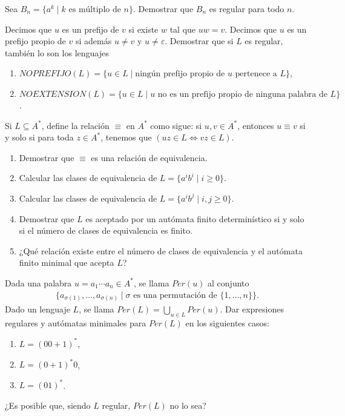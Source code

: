 \begin{ejercicio}
    Sea $B_n = \{a^k \mid k \text{ es múltiplo de } n\}$. Demostrar que $B_n$ es regular para todo $n$.
\end{ejercicio}

\begin{ejercicio}
    Decimos que $u$ es un prefijo de $v$ si existe $w$ tal que $uw = v$. Decimos que $u$ es un prefijo propio de $v$ si además $u \neq v$ y $u \neq \varepsilon$. Demostrar que si $L$ es regular, también lo son los lenguajes
    \begin{enumerate}
        \item $NOPREFIJO(L) = \{u \in L \mid \text{ningún prefijo propio de } u \text{ pertenece a } L\}$,
        \item $NOEXTENSION(L) = \{u \in L \mid u \text{ no es un prefijo propio de ninguna palabra de } L\}$.
    \end{enumerate}
\end{ejercicio}

\begin{ejercicio}
    Si $L \subseteq A^*$, define la relación $\equiv$ en $A^*$ como sigue: si $u, v \in A^*$, entonces $u \equiv v$ si y solo si para toda $z \in A^*$, tenemos que $(uz \in L \Leftrightarrow vz \in L)$.
    \begin{enumerate}
        \item Demostrar que $\equiv$ es una relación de equivalencia.
        \item Calcular las clases de equivalencia de $L = \{a^ib^i \mid i \geq 0\}$.
        \item Calcular las clases de equivalencia de $L = \{a^ib^j \mid i, j \geq 0\}$.
        \item Demostrar que $L$ es aceptado por un autómata finito determinístico si y solo si el número de clases de equivalencia es finito.
        \item ¿Qué relación existe entre el número de clases de equivalencia y el autómata finito minimal que acepta $L$?
    \end{enumerate}
\end{ejercicio}

\begin{ejercicio}
    Dada una palabra $u = a_1 \cdots a_n \in A^*$, se llama $Per(u)$ al conjunto
    \begin{align*}
        \{a_{\sigma(1)}, \ldots, a_{\sigma(n)} \mid \sigma \text{ es una permutación de } \{1, \ldots, n\}\}.
    \end{align*}
    Dado un lenguaje $L$, se llama $Per(L) = \bigcup_{u \in L} Per(u)$.
    Dar expresiones regulares y autómatas minimales para $Per(L)$ en los siguientes casos:
    \begin{enumerate}
        \item $L = (00 + 1)^*$,
        \item $L = (0 + 1)^*0$,
        \item $L = (01)^*$.
    \end{enumerate}
    ¿Es posible que, siendo $L$ regular, $Per(L)$ no lo sea?
\end{ejercicio}